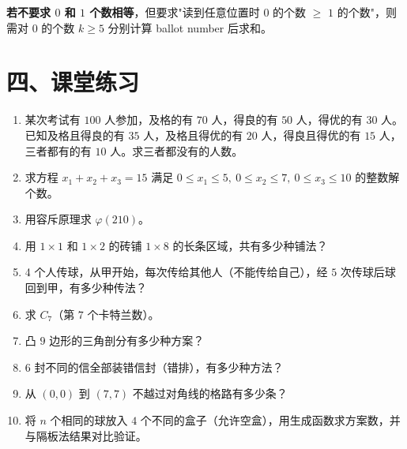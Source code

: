 \documentclass[12pt, a4paper]{ctexart}
\begin{document}
\textbf{若不要求 \(0\) 和 \(1\) 个数相等}，但要求"读到任意位置时 \(0\) 的个数 \(\ge\) \(1\) 的个数"，则需对 \(0\) 的个数 \(k \ge 5\) 分别计算 ballot number 后求和。

\section*{\textcolor{tipgreen}{四、课堂练习}}

\begin{enumerate}[leftmargin=2em]
  \item 某次考试有 \(100\) 人参加，及格的有 \(70\) 人，得良的有 \(50\) 人，得优的有 \(30\) 人。已知及格且得良的有 \(35\) 人，及格且得优的有 \(20\) 人，得良且得优的有 \(15\) 人，三者都有的有 \(10\) 人。求三者都没有的人数。

  \item 求方程 \(x_1+x_2+x_3 = 15\) 满足 \(0\le x_1 \le 5,\ 0\le x_2 \le 7,\ 0\le x_3 \le 10\) 的整数解个数。

  \item 用容斥原理求 \(\varphi(210)\)。

  \item 用 \(1\times 1\) 和 \(1\times 2\) 的砖铺 \(1\times 8\) 的长条区域，共有多少种铺法？

  \item 4 个人传球，从甲开始，每次传给其他人（不能传给自己），经 \(5\) 次传球后球回到甲，有多少种传法？

  \item 求 \(C_7\)（第 \(7\) 个卡特兰数）。

  \item 凸 \(9\) 边形的三角剖分有多少种方案？

  \item \(6\) 封不同的信全部装错信封（错排），有多少种方法？

  \item 从 \((0,0)\) 到 \((7,7)\) 不越过对角线的格路有多少条？

  \item 将 \(n\) 个相同的球放入 \(4\) 个不同的盒子（允许空盒），用生成函数求方案数，并与隔板法结果对比验证。
\end{enumerate}

\vspace{10pt}
\end{document}

